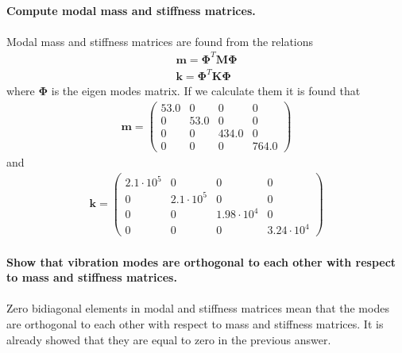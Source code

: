 \documentclass[]{report}
\begin{document}
\newpage
~\\
\textbf{Compute modal mass and stiffness matrices.}
\\~\\
Modal mass and stiffness matrices are found from the relations
\begin{align*}
\mathbf{m}=\mathbf{\Phi}^T \mathbf{M} \mathbf{\Phi} \\
\mathbf{k}=\mathbf{\Phi}^T \mathbf{K} \mathbf{\Phi}
\end{align*}
where $\mathbf{\Phi}$ is the eigen modes matrix. If we calculate them it is found that
\begin{align*}
\mathbf{m}=\left(\begin{array}{cccc} 53.0 & 0 & 0 & 0\\ 0 & 53.0 & 0 & 0\\ 0 & 0 & 434.0 & 0\\ 0 & 0 & 0 & 764.0 \end{array}\right)
\end{align*}
and
\begin{align*}
\mathbf{k}=\left(\begin{array}{cccc} 2.1\cdot 10^5 & 0 & 0 & 0\\ 0 & 2.1\cdot 10^5 & 0 & 0\\ 0 & 0 & 1.98\cdot 10^4 & 0\\ 0 & 0 & 0 & 3.24\cdot 10^4 \end{array}\right)
\end{align*}
\newpage
~\\
\textbf{Show that vibration modes are orthogonal to each other with respect to mass and stiffness matrices.}
\\~\\
Zero bidiagonal elements in modal and stiffness matrices mean that the modes are orthogonal to each other with respect to mass and stiffness matrices. It is already showed that they are equal to zero in the previous answer.
\end{document}

